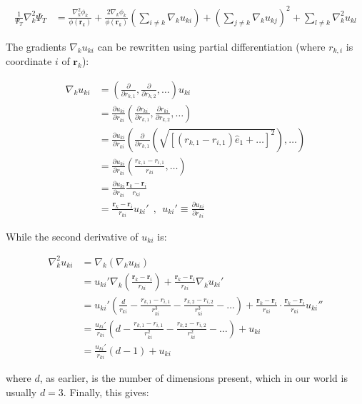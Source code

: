 \documentclass[english, a4paper]{article}
\newcommand{\bm}[1]{\mathbf{#1}}
\begin{document}
\begin{align}
	\frac{1}{\Psi_T}\nabla_k^2\Psi_T &= \frac{\nabla_k^2\phi_k}{\phi(\bm{r}_k)} + \frac{2\nabla_k\phi_k}{\phi(\bm{r}_k)}\left(\sum_{i\neq k}\nabla_ku_{ki} \right) + \left(\sum_{j\neq k}\nabla_ku_{kj} \right)^2 + \sum_{l\neq k}\nabla_k^2u_{kl}
\end{align}

The gradients $\nabla_k u_{ki}$ can be rewritten using partial differentiation (where $r_{k,i}$ is coordinate $i$ of $\bm{r}_k$):

\begin{align*}
	\nabla_k u_{ki} &= \left(\frac{\partial}{\partial r_{k,1}}, \frac{\partial}{\partial r_{k,2}}, \ldots\right)u_{ki}\\
	&= \frac{\partial u_{ki}}{\partial r_{ki}}\left(\frac{\partial r_{ki}}{\partial r_{k,1}}, \frac{\partial r_{ki}}{\partial r_{k,2}}, \ldots\right)\\
	&= \frac{\partial u_{ki}}{\partial r_{ki}}\left( \frac{\partial}{\partial r_{k,1}}\left(\sqrt{\left[(r_{k,1}-r_{i,1})\hat{e}_1 + \ldots\right]^2}\right), \ldots \right)\\
	&= \frac{\partial u_{ki}}{\partial r_{ki}}\left(\frac{r_{k,1} - r_{i,1}}{r_{ki}}, \ldots \right)\\
	&= \frac{\partial u_{ki}}{\partial r_{ki}}\frac{\bm{r}_k - \bm{r}_i}{r_{ki}}\\
	&= \frac{\bm{r}_k - \bm{r}_i}{r_{ki}} u_{ki}' \:\:,\:\:  u_{ki}'\equiv \frac{\partial u_{ki}}{\partial r_{ki}}
\end{align*}

While the second derivative of $u_{ki}$ is:

\begin{align*}
	\nabla_k^2 u_{ki} &= \nabla_k(\nabla_ku_{ki})\\
	&= u_{ki}'\nabla_k\left(\frac{\bm{r}_k - \bm{r}_i}{r_{ki}}\right) + \frac{\bm{r}_k - \bm{r}_i}{r_{ki}}\nabla_k u_{ki}'\\
	&= u_{ki}' \left(\frac{d}{r_{ki}} - \frac{r_{k,1}-r_{i,1}}{r_{ki}^3} - \frac{r_{k,2}-r_{i,2}}{r_{ki}^3} - \ldots\right) + \frac{\bm{r}_k - \bm{r}_i}{r_{ki}}\cdot\frac{\bm{r}_k - \bm{r}_i}{r_{ki}} u_{ki}''\\
	&= \frac{u_{ki}'}{r_{ki}} \left(d - \frac{r_{k,1}-r_{i,1}}{r_{ki}^2} - \frac{r_{k,2}-r_{i,2}}{r_{ki}^2} - \ldots\right) + u_{ki}\\
	&= \frac{u_{ki}'}{r_{ki}} \left(d - 1\right) + u_{ki}
\end{align*}

where $d$, as earlier, is the number of dimensions present, which in our world is usually $d=3$. Finally, this gives:
\end{document}

